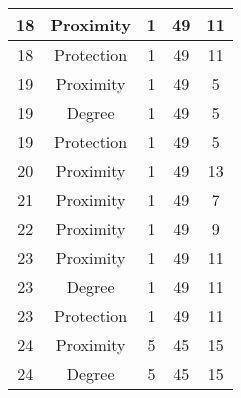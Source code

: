 \documentclass[results.tex]{subfiles}
\begin{document}
\begin{center}
\begin{tabular}{| c || c | c | c | c |}
            \hline
            18                      & Proximity                    & 1                      & 49                      & 11                   \\
            \hline
            18                      & Protection                   & 1                      & 49                      & 11                   \\
            \hline
            19                      & Proximity                    & 1                      & 49                      & 5                    \\
            \hline
            19                      & Degree                       & 1                      & 49                      & 5                    \\
            \hline
            19                      & Protection                   & 1                      & 49                      & 5                    \\
            \hline
            20                      & Proximity                    & 1                      & 49                      & 13                   \\
            \hline
            21                      & Proximity                    & 1                      & 49                      & 7                    \\
            \hline
            22                      & Proximity                    & 1                      & 49                      & 9                    \\
            \hline
            23                      & Proximity                    & 1                      & 49                      & 11                   \\
            \hline
            23                      & Degree                       & 1                      & 49                      & 11                   \\
            \hline
            23                      & Protection                   & 1                      & 49                      & 11                   \\
            \hline
            24                      & Proximity                    & 5                      & 45                      & 15                   \\
            \hline
            24                      & Degree                       & 5                      & 45                      & 15                   \\

\end{tabular}
\end{center}
\end{document}
